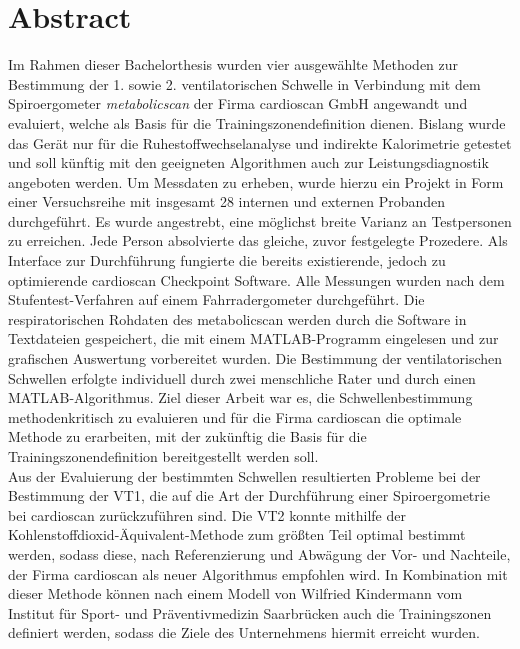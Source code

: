\chapter*{Abstract}

Im Rahmen dieser Bachelorthesis wurden vier ausgewählte Methoden zur Bestimmung der 1. sowie 2. ventilatorischen Schwelle in Verbindung mit dem Spiroergometer \textsl{metabolicscan} der Firma cardioscan GmbH angewandt und evaluiert, welche als Basis für die Trainingszonendefinition dienen. Bislang wurde das Gerät nur für die Ruhestoffwechselanalyse und indirekte Kalorimetrie getestet und soll künftig mit den geeigneten Algorithmen auch zur Leistungsdiagnostik angeboten werden. Um Messdaten zu erheben, wurde hierzu ein Projekt in Form einer Versuchsreihe mit insgesamt 28 internen und externen Probanden durchgeführt. Es wurde angestrebt, eine möglichst breite Varianz an Testpersonen zu erreichen. Jede Person absolvierte das gleiche, zuvor festgelegte Prozedere. Als Interface zur Durchführung fungierte die bereits existierende, jedoch zu optimierende cardioscan Checkpoint Software. Alle Messungen wurden nach dem Stufentest-Verfahren auf einem Fahrradergometer durchgeführt. Die respiratorischen Rohdaten des metabolicscan werden durch die Software in Textdateien gespeichert, die mit einem MATLAB-Programm eingelesen und zur grafischen Auswertung vorbereitet wurden. Die Bestimmung der ventilatorischen Schwellen erfolgte individuell durch zwei menschliche Rater und durch einen MATLAB-Algorithmus. Ziel dieser Arbeit war es, die Schwellenbestimmung methodenkritisch zu evaluieren und für die Firma cardioscan die optimale Methode zu erarbeiten, mit der zukünftig die Basis für die Trainingszonendefinition bereitgestellt werden soll.\\
Aus der Evaluierung der bestimmten Schwellen resultierten Probleme bei der Bestimmung der VT1, die auf die Art der Durchführung einer Spiroergometrie bei cardioscan zurückzuführen sind. Die VT2 konnte mithilfe der Kohlenstoffdioxid-Äquivalent-Methode zum größten Teil optimal bestimmt werden, sodass diese, nach Referenzierung und Abwägung der Vor- und Nachteile, der Firma cardioscan als neuer Algorithmus empfohlen wird. In Kombination mit dieser Methode können nach einem Modell von Wilfried Kindermann vom Institut für Sport- und Präventivmedizin Saarbrücken auch die Trainingszonen definiert werden, sodass die Ziele des Unternehmens hiermit erreicht wurden.
